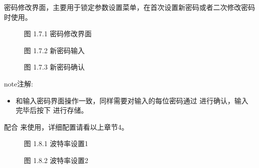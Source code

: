 \documentclass[a4paper,10pt,english]{sphinxmanual}
\begin{document}
\sphinxAtStartPar
{}

\sphinxAtStartPar
密码修改界面，主要用于锁定参数设置菜单，在首次设置新密码或者二次修改密码时使用。

\begin{figure}[htbp]
\centering
\capstart

\noindent{}
\caption{图 1.7.1 密码修改界面}\label{\detokenize{operation_guide:id19}}\end{figure}

\begin{figure}[htbp]
\centering
\capstart

\noindent{}
\caption{图 1.7.2 新密码输入}\label{\detokenize{operation_guide:id20}}\end{figure}

\begin{figure}[htbp]
\centering
\capstart

\noindent{}
\caption{图 1.7.3 新密码确认}\label{\detokenize{operation_guide:id21}}\end{figure}

\begin{sphinxadmonition}{note}{注解:}\begin{itemize}
\item {} 
\sphinxAtStartPar
和输入密码界面操作一致，同样需要对输入的每位密码通过  进行确认，输入完毕后按下  进行存储。

\end{itemize}
\end{sphinxadmonition}

\sphinxAtStartPar
{}

\sphinxAtStartPar
配合  来使用，详细配置请看以上章节4。

\begin{figure}[htbp]
\centering
\capstart

\noindent{}
\caption{图 1.8.1 波特率设置1}\label{\detokenize{operation_guide:id22}}\end{figure}

\begin{figure}[htbp]
\centering
\capstart

\noindent{}
\caption{图 1.8.2 波特率设置2}\label{\detokenize{operation_guide:id23}}\end{figure}
\end{document}
